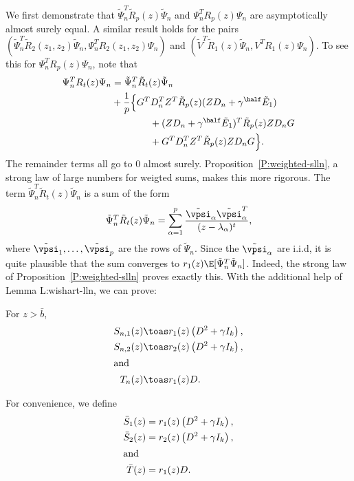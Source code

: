 We first demonstrate that $\tilde \Psi_n^T \tilde R_p(z) \tilde \Psi_n$ and 
$\Psi_n^T R_p (z) \Psi_n$ are asymptotically almost surely
equal. A similar result holds for the pairs 
$(\tilde \Psi_n^T \tilde R_2(z_1, z_2) \tilde \Psi_n,
  \Psi_n^T R_2(z_1, z_2) \Psi_n)$
and $(\tilde V^T \tilde R_1(z) \tilde \Psi_n, V^T R_1(z) \Psi_n)$.
To see this for $\Psi_n^T R_p(z) \Psi_n$, note that
\begin{align*}
    \begin{split}
    \Psi_n^T R_t (z) \Psi_n
    &=
    \tilde \Psi_n^T \tilde R_t(z) \tilde \Psi_n \\
        &+ \frac{1}{p} \Big\{
        G^T D_n^T Z^T \tilde R_p(z) ( Z D_n + \gamma^\half \tilde E_1) \\
        &\qquad \qquad +
        ( Z D_n + \gamma^\half \tilde E_1)^T \tilde R_p(z) Z D_n G \\
        &\qquad \qquad +
        G^T D_n^T Z^T \tilde R_p(z) Z D_n G
        \Big\}.
    \end{split}
\end{align*}
The remainder terms all go to $0$ almost surely.
Proposition~\ref{P:weighted-slln}, a strong law of large numbers for weigted sums,
makes this more rigorous.  The term 
$\tilde \Psi_n^T \tilde R_t(z) \tilde \Psi_n$ is a sum of the form
\[
    \tilde \Psi_n^T \tilde R_t(z) \tilde \Psi_n 
    =
    \sum_{\alpha=1}^p
        \frac{\tilde \vpsi_\alpha \tilde \vpsi^T_\alpha }
             {(z - \lambda_\alpha)^t},
\]
where $\tilde \vpsi_1, \ldots, \tilde \vpsi_p$ are the rows of $\tilde \Psi_n$.
Since the $\tilde \vpsi_\alpha$ are i.i.d, it is quite plausible that the sum
converges to $r_1(z) \E[ \tilde \Psi_n^T \tilde \Psi_n ]$.  Indeed, the strong
law of Proposition~\ref{P:weighted-slln} proves exactly this.  With the additional
help of Lemma {L:wishart-lln}, we can prove:

\begin{lemma}\label{L:Sbar}
    For $z > \bar b$, 
    \begin{align*}
        S_{n,1}(z) &\toas r_1(z) \left( D^2 + \gamma I_k \right), \\
        S_{n,2}(z) &\toas r_2(z) \left( D^2 + \gamma I_k \right), \\
    \intertext{and}
        T_n(z) &\toas r_1(z) D.
    \end{align*}
\end{lemma}

For convenience, we define
\begin{align*}
    \bar S_1(z) &= r_1(z) \left( D^2 + \gamma I_k \right), \\
    \bar S_2(z) &= r_2(z) \left( D^2 + \gamma I_k \right), \\
\intertext{and}
    \bar T(z) &= r_1(z) D.
\end{align*}

